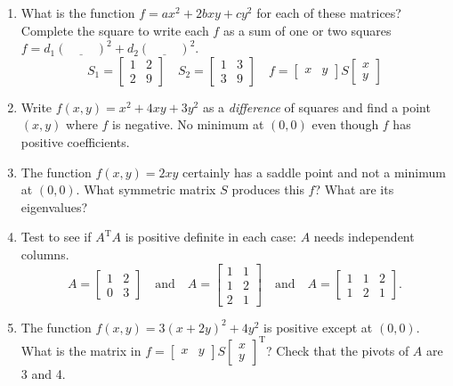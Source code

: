 \documentclass[14pt, a4paper]{article}
\begin{document}
\begin{enumerate}
    \item What is the function $f = ax^2 + 2bxy + cy^2$ for each of these matrices? Complete the square to write each $f$ as a sum of one or two squares $f = d_1(\underline{\hspace{1cm}})^2 + d_2(\underline{\hspace{1cm}})^2$.
          \[
              S_1 = \begin{bmatrix} 1 & 2 \\ 2 & 9 \end{bmatrix} \quad S_2 = \begin{bmatrix} 1 & 3 \\ 3 & 9 \end{bmatrix} \quad f = \begin{bmatrix} x & y \end{bmatrix} S \begin{bmatrix} x \\ y \end{bmatrix}
          \]

    \item Write $f(x, y) = x^2 + 4xy + 3y^2$ as a \textit{difference} of squares and find a point $(x, y)$ where $f$ is negative. No minimum at $(0, 0)$ even though $f$ has positive coefficients.

    \item The function $f(x, y) = 2xy$ certainly has a saddle point and not a minimum at $(0, 0)$. What symmetric matrix $S$ produces this $f$? What are its eigenvalues?

    \item Test to see if $A^{\mathrm{T}}A$ is positive definite in each case: $A$ needs independent columns.
          \[
              A = \begin{bmatrix} 1 & 2 \\ 0 & 3 \end{bmatrix} \quad \text{and} \quad A = \begin{bmatrix} 1 & 1 \\ 1 & 2 \\ 2 & 1 \end{bmatrix} \quad \text{and} \quad A = \begin{bmatrix} 1 & 1 & 2 \\ 1 & 2 & 1 \end{bmatrix}.
          \]

    \item The function $f(x, y) = 3(x + 2y)^2 + 4y^2$ is positive except at $(0, 0)$. What is the matrix in $f = \begin{bmatrix} x & y \end{bmatrix}S\begin{bmatrix} x \\ y \end{bmatrix}^{\mathrm{T}}$? Check that the pivots of $A$ are 3 and 4.


\end{enumerate}
\end{document}
